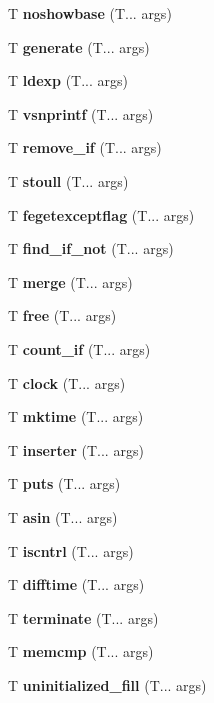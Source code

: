 \begin{DoxyCompactItemize}
\mbox{\label{showbase}} 
T \textbf{ noshowbase} (T... args)
\item 
\mbox{\label{generate}} 
T \textbf{ generate} (T... args)
\item 
\mbox{\label{ldexp}} 
T \textbf{ ldexp} (T... args)
\item 
\mbox{\label{vfprintf}} 
T \textbf{ vsnprintf} (T... args)
\item 
\mbox{\label{remove}} 
T \textbf{ remove\+\_\+if} (T... args)
\item 
\mbox{\label{stoul}} 
T \textbf{ stoull} (T... args)
\item 
\mbox{\label{feexceptflag}} 
T \textbf{ fegetexceptflag} (T... args)
\item 
\mbox{\label{find}} 
T \textbf{ find\+\_\+if\+\_\+not} (T... args)
\item 
\mbox{\label{merge}} 
T \textbf{ merge} (T... args)
\item 
\mbox{\label{free}} 
T \textbf{ free} (T... args)
\item 
\mbox{\label{count}} 
T \textbf{ count\+\_\+if} (T... args)
\item 
\mbox{\label{clock}} 
T \textbf{ clock} (T... args)
\item 
\mbox{\label{mktime}} 
T \textbf{ mktime} (T... args)
\item 
\mbox{\label{inserter}} 
T \textbf{ inserter} (T... args)
\item 
\mbox{\label{puts}} 
T \textbf{ puts} (T... args)
\item 
\mbox{\label{asin}} 
T \textbf{ asin} (T... args)
\item 
\mbox{\label{iscntrl}} 
T \textbf{ iscntrl} (T... args)
\item 
\mbox{\label{difftime}} 
T \textbf{ difftime} (T... args)
\item 
\mbox{\label{terminate}} 
T \textbf{ terminate} (T... args)
\item 
\mbox{\label{memcmp}} 
T \textbf{ memcmp} (T... args)
\item 
\mbox{\label{uninitialized_fill}} 
T \textbf{ uninitialized\+\_\+fill} (T... args)
\item 

\end{DoxyCompactItemize}
